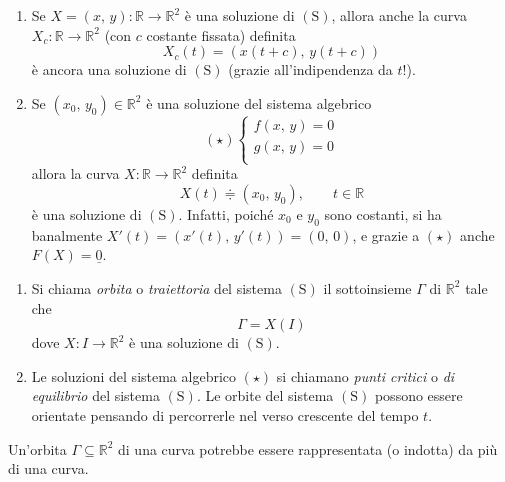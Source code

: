 \begin{obs}
\mbox{}
\begin{enumerate}[labelindent=\parindent,leftmargin=*,label=\textnormal{(\arabic*)},start=1]
\item Se $X = (x,\,y) : \mathbb{R} \longrightarrow \mathbb{R}^2$ è una soluzione di $\mathrm{(S)}$, allora anche la curva $X_{c} : \mathbb{R} \longrightarrow \mathbb{R}^2$ (con $c$ costante fissata) definita
$$
X_c(t) = \left( x(t+c),\,y(t+c) \right)
$$
è ancora una soluzione di $\mathrm{(S)}$ (grazie all'indipendenza da $t$!).
\item Se $(x_0,\,y_0) \in \mathbb{R}^2$ è una soluzione del sistema algebrico
$$
\mathrm{(\star)}
\begin{cases}
f(x,\,y) = 0\\
g(x,\,y) = 0\\
\end{cases}
$$
allora la curva $X : \mathbb{R} \longrightarrow \mathbb{R}^2$ definita
$$
X(t) \doteqdot (x_0,\,y_0), \qquad t \in \mathbb{R}
$$
è una soluzione di $\mathrm{(S)}$. Infatti, poiché $x_0$ e $y_0$ sono costanti, si ha banalmente $X'(t) = (x'(t),\,y'(t)) = (0,\,0)$, e grazie a $\mathrm{(\star)}$ anche $F(X) = \underline{0}$.
\end{enumerate}
\end{obs}


\begin{definition}
\mbox{}
\begin{enumerate}[labelindent=\parindent,leftmargin=*,label=\textnormal{(\roman*)},start=1]
\item Si chiama \emph{orbita} o \emph{traiettoria} del sistema $\mathrm{(S)}$ il sottoinsieme $\Gamma$ di $\mathbb{R}^2$ tale che
$$
\Gamma = X(I)
$$
dove $X : I \longrightarrow \mathbb{R}^2$ è una soluzione di $\mathrm{(S)}$.
\item Le soluzioni del sistema algebrico $\mathrm{(\star)}$ si chiamano \emph{punti critici} o \emph{di equilibrio} del sistema $\mathrm{(S)}$.
Le orbite del sistema $\mathrm{(S)}$ possono essere orientate pensando di percorrerle nel verso crescente del tempo $t$.
\end{enumerate}
\end{definition}

\begin{obs}
Un'orbita $\Gamma \subseteq \mathbb{R}^2$ di una curva potrebbe essere rappresentata (o indotta) da più di una curva.
\end{obs}

